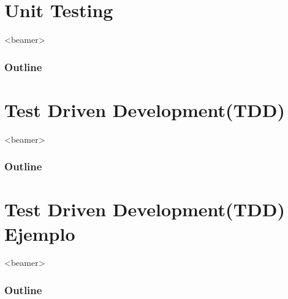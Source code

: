 \documentclass[notes=hide,xcolor=svgnames,professionalfonts,lualatex]{beamer}
\begin{document}

\section{Unit Testing}
\begin{frame}<beamer>
    \frametitle{Outline}
    \tableofcontents[currentsection]
\end{frame}


\section{Test Driven Development(TDD)}
\begin{frame}<beamer>
    \frametitle{Outline}
    \tableofcontents[currentsection]
\end{frame}


\section{Test Driven Development(TDD) Ejemplo}
\begin{frame}<beamer>
    \frametitle{Outline}
    \tableofcontents[currentsection]
\end{frame}

\end{document}
